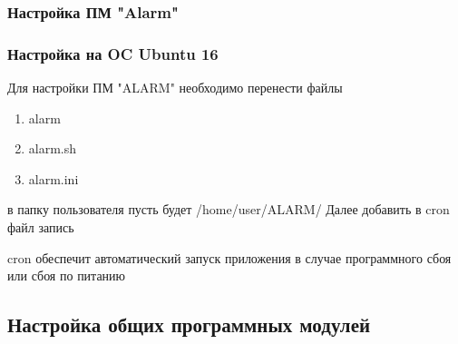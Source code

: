 \documentclass[12pt]{article}[a4paper,14pt,russian]
\begin{document}
	\subsubsection{Настройка ПМ "Alarm"}
	\subsubsection{Настройка на OC Ubuntu 16}
	Для настройки ПМ "ALARM" необходимо перенести файлы
	\begin{enumerate}
	\item alarm
	\item alarm.sh
	\item alarm.ini
	\end{enumerate}
	
	в папку пользователя пусть будет /home/user/ALARM/
	Далее добавить в cron файл запись 

	cron обеспечит автоматический запуск приложения в случае программного сбоя или сбоя по питанию
	\subsection{Настройка общих программных модулей}
\end{document}
